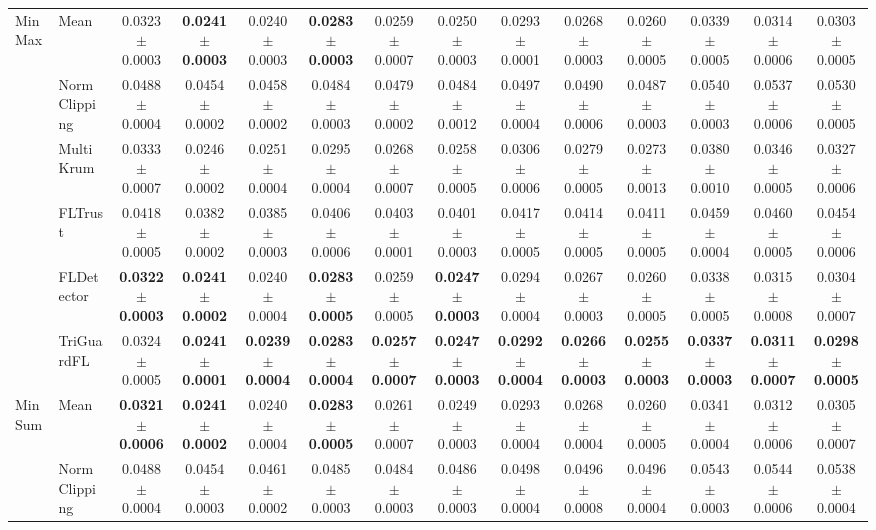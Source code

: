 \begin{table}[t]
\begin{tabular}{l l c c c c c c c c c c c c}
\midrule
\multirow{6}{*}{MinMax} & Mean & 0.0323$\pm$0.0003 & \textbf{0.0241$\pm$0.0003} & 0.0240$\pm$0.0003 & \textbf{0.0283$\pm$0.0003} & 0.0259$\pm$0.0007 & 0.0250$\pm$0.0003 & 0.0293$\pm$0.0001 & 0.0268$\pm$0.0003 & 0.0260$\pm$0.0005 & 0.0339$\pm$0.0005 & 0.0314$\pm$0.0006 & 0.0303$\pm$0.0005 \\
 & NormClipping & 0.0488$\pm$0.0004 & 0.0454$\pm$0.0002 & 0.0458$\pm$0.0002 & 0.0484$\pm$0.0003 & 0.0479$\pm$0.0002 & 0.0484$\pm$0.0012 & 0.0497$\pm$0.0004 & 0.0490$\pm$0.0006 & 0.0487$\pm$0.0003 & 0.0540$\pm$0.0003 & 0.0537$\pm$0.0006 & 0.0530$\pm$0.0005 \\
 & MultiKrum & 0.0333$\pm$0.0007 & 0.0246$\pm$0.0002 & 0.0251$\pm$0.0004 & 0.0295$\pm$0.0004 & 0.0268$\pm$0.0007 & 0.0258$\pm$0.0005 & 0.0306$\pm$0.0006 & 0.0279$\pm$0.0005 & 0.0273$\pm$0.0013 & 0.0380$\pm$0.0010 & 0.0346$\pm$0.0005 & 0.0327$\pm$0.0006 \\
 & FLTrust & 0.0418$\pm$0.0005 & 0.0382$\pm$0.0002 & 0.0385$\pm$0.0003 & 0.0406$\pm$0.0006 & 0.0403$\pm$0.0001 & 0.0401$\pm$0.0003 & 0.0417$\pm$0.0005 & 0.0414$\pm$0.0005 & 0.0411$\pm$0.0005 & 0.0459$\pm$0.0004 & 0.0460$\pm$0.0005 & 0.0454$\pm$0.0006 \\
 & FLDetector & \textbf{0.0322$\pm$0.0003} & \textbf{0.0241$\pm$0.0002} & 0.0240$\pm$0.0004 & \textbf{0.0283$\pm$0.0005} & 0.0259$\pm$0.0005 & \textbf{0.0247$\pm$0.0003} & 0.0294$\pm$0.0004 & 0.0267$\pm$0.0003 & 0.0260$\pm$0.0005 & 0.0338$\pm$0.0005 & 0.0315$\pm$0.0008 & 0.0304$\pm$0.0007 \\
 & TriGuardFL & 0.0324$\pm$0.0005 & \textbf{0.0241$\pm$0.0001} & \textbf{0.0239$\pm$0.0004} & \textbf{0.0283$\pm$0.0004} & \textbf{0.0257$\pm$0.0007} & \textbf{0.0247$\pm$0.0003} & \textbf{0.0292$\pm$0.0004} & \textbf{0.0266$\pm$0.0003} & \textbf{0.0255$\pm$0.0003} & \textbf{0.0337$\pm$0.0003} & \textbf{0.0311$\pm$0.0007} & \textbf{0.0298$\pm$0.0005} \\
\midrule
\multirow{6}{*}{MinSum} & Mean & \textbf{0.0321$\pm$0.0006} & \textbf{0.0241$\pm$0.0002} & 0.0240$\pm$0.0004 & \textbf{0.0283$\pm$0.0005} & 0.0261$\pm$0.0007 & 0.0249$\pm$0.0003 & 0.0293$\pm$0.0004 & 0.0268$\pm$0.0004 & 0.0260$\pm$0.0005 & 0.0341$\pm$0.0004 & 0.0312$\pm$0.0006 & 0.0305$\pm$0.0007 \\
 & NormClipping & 0.0488$\pm$0.0004 & 0.0454$\pm$0.0003 & 0.0461$\pm$0.0002 & 0.0485$\pm$0.0003 & 0.0484$\pm$0.0003 & 0.0486$\pm$0.0003 & 0.0498$\pm$0.0004 & 0.0496$\pm$0.0008 & 0.0496$\pm$0.0004 & 0.0543$\pm$0.0003 & 0.0544$\pm$0.0006 & 0.0538$\pm$0.0004 \\

\end{tabular}
\end{table}

